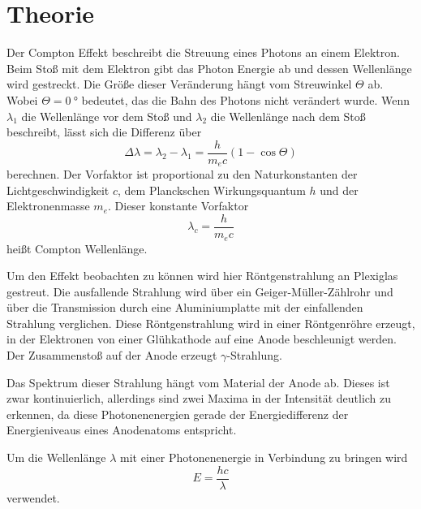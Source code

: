 \section{Theorie}
\label{sec:Theorie}




Der Compton Effekt beschreibt die Streuung eines Photons an einem Elektron.
Beim Stoß mit dem Elektron gibt das Photon Energie ab und dessen Wellenlänge wird gestreckt.
Die Größe dieser Veränderung hängt vom Streuwinkel $\Theta$ ab. 
Wobei $\Theta=\SI{0}{\degree}$ bedeutet, das die Bahn des Photons nicht verändert wurde.
Wenn $\lambda_1$ die Wellenlänge vor dem Stoß und $\lambda_2$ die Wellenlänge nach dem Stoß beschreibt, lässt sich die Differenz über
\begin{equation}
    \Delta \lambda = \lambda_2 - \lambda_1 = \frac{h}{m_e c}(1-\cos \Theta)
    \label{eq:differenz}
\end{equation}
berechnen.
Der Vorfaktor ist proportional zu den Naturkonstanten der Lichtgeschwindigkeit $c$, dem Planckschen Wirkungsquantum $h$ und der Elektronenmasse $m_e$.
Dieser konstante Vorfaktor 
\begin{equation}
    \lambda_c = \frac{h}{m_e c}
    \label{eq:compton-wellenlänge}
\end{equation}
heißt Compton Wellenlänge.

Um den Effekt beobachten zu können wird hier Röntgenstrahlung an Plexiglas gestreut. 
Die ausfallende Strahlung wird über ein Geiger-Müller-Zählrohr und über die Transmission durch eine Aluminiumplatte mit der einfallenden Strahlung verglichen.
Diese Röntgenstrahlung wird in einer Röntgenröhre erzeugt, in der Elektronen von einer Glühkathode auf eine Anode beschleunigt werden. 
Der Zusammenstoß auf der Anode erzeugt $\gamma$-Strahlung.

Das Spektrum dieser Strahlung hängt vom Material der Anode ab.
Dieses ist zwar kontinuierlich, allerdings sind zwei Maxima in der Intensität deutlich zu erkennen, da diese Photonenenergien gerade der Energiedifferenz der Energieniveaus eines Anodenatoms entspricht.

Um die Wellenlänge $\lambda$ mit einer Photonenenergie in Verbindung zu bringen wird 
\begin{equation}
    E = \frac{h c}{\lambda}
    \label{eq:photonenenergie}
\end{equation} 
verwendet.

